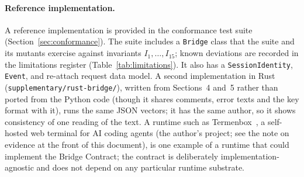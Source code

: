 \paragraph{Reference implementation.} A reference implementation is
provided in the conformance test suite (Section~\ref{sec:conformance}).
The suite includes a \texttt{Bridge} class that the suite and its mutants
exercise against invariants $I_1, \ldots, I_{15}$; known deviations are
recorded in the limitations register (Table~\ref{tab:limitations}). It also has a
\texttt{SessionIdentity}, \texttt{Event}, and re-attach request data
model. A second implementation in Rust
(\texttt{supplementary/rust-bridge/}), written from Sections~4 and~5
rather than ported from the Python code (though it shares comments, error
texts and the key format with it), runs the same JSON vectors; it
has the same author, so it shows consistency of one reading of the
text. A runtime such as
Termenbox~\cite{termenbox}, a self-hosted web terminal for AI coding agents
(the author's project; see the note on evidence at the front of this
document), is one
example of a runtime that could implement the Bridge Contract; the
contract is deliberately implementation-agnostic and does not depend
on any particular runtime substrate.

